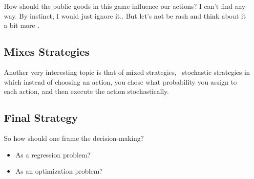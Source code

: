 \documentclass[10pt,fleqn]{article}
\begin{document}
How should the public goods in this game influence our actions? I can't find any
way. By instinct, I would just ignore it.. But let's not be rash and think about
it a bit more \smiley.

\subsection{Mixes Strategies}

Another very interesting topic is that of mixed strategies, \ie\ stochastic
strategies in which instead of choosing an action, you chose what probability you
assign to each action, and then execute the action stochastically.

\subsection{Final Strategy}

So how should one frame the decision-making?
\begin{itemize}
  \item As a regression problem?
  \item As an optimization problem?
\end{itemize}
\end{document}
